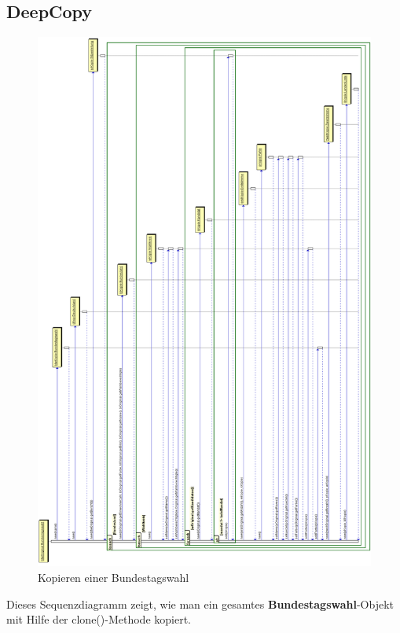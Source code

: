 \documentclass[12pt,a4paper,titlepage]{article}
\newcommand{\myma}{\fontfamily{pcr}\selectfont \textbf}
\begin{document}
\subsection{DeepCopy}
\begin{figure}[!ht]
\centering
\includegraphics[scale=0.37]{DeepCopy.png} \caption{Kopieren einer Bundestagswahl} 
\end{figure}
Dieses Sequenzdiagramm zeigt, wie man ein gesamtes {\myma{Bundestagswahl}}-Objekt mit Hilfe der clone()-Methode kopiert. \\
\end{document}
